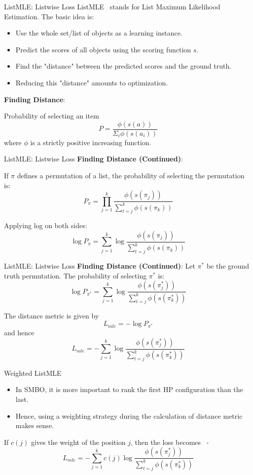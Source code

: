 \documentclass{beamer}
\begin{document}
\begin{frame}[t]{ListMLE: Listwise Loss}
ListMLE~\cite{listmlepaper} stands for List Maximum Likelihood Estimation.
The basic idea is:
\begin{itemize}
\item Use the whole set/list of objects as a learning instance.
\item Predict the scores of all objects using the scoring function $s$.
\item Find the "distance" between the predicted scores and the ground truth.
\item Reducing this "distance" amounts to optimization.
\end{itemize}

\textbf{Finding Distance}:

Probability of selecting an item
$$
P = \frac{\phi(s(a))}{\Sigma_i \phi(s(a_i))} 
$$
where $\phi$ is a strictly positive increasing function.
\end{frame}

\begin{frame}[t]{ListMLE: Listwise Loss}
\textbf{Finding Distance (Continued)}:

If $\pi$ defines a permutation of a list,  the probability of selecting the permutation is:
$$
P_{\pi} = \prod\limits_{j=1}^{k} \frac{\phi(s(\pi_j))}{ \sum\limits_{t=j}^k \phi(s(\pi_k))}
$$

Applying log on both sides:
$$
\log P_{\pi} = \sum\limits_{j=1}^{k} \log \frac{\phi(s(\pi_j))}{ \sum\limits_{t=j}^k \phi(s(\pi_k))}
$$

\end{frame}


\begin{frame}[t]{ListMLE: Listwise Loss}
\textbf{Finding Distance (Continued)}:
Let $\pi^*$ be the ground truth permutation. The probability of selecting $\pi^*$ is:
$$
\log P_{\pi^*} = \sum\limits_{j=1}^{k} \log \frac{\phi(s(\pi^*_j))}{ \sum\limits_{t=j}^k \phi(s(\pi^*_k))}
$$

The distance metric is given by
$$
L_{mle} = - \log P_{\pi^*}
$$
and hence
$$
L_{mle} = -  \sum\limits_{j=1}^{k} \log \frac{\phi(s(\pi^*_j))}{ \sum\limits_{t=j}^k \phi(s(\pi^*_k))}
$$

\end{frame}

\begin{frame}[t]{Weighted ListMLE}
\begin{itemize}
\item In SMBO,  it is more important to rank the first HP configuration than the last.
\item Hence,  using a weighting strategy during the calculation of distance metric makes sense.
\end{itemize}

If $c(j)$ gives the weight of the position $j$, then the loss becomes~\cite{TRLWO} -
$$
L_{mle} = -  \sum\limits_{j=1}^{k} c(j) \log \frac{\phi(s(\pi^*_j))}{ \sum\limits_{t=j}^k \phi(s(\pi^*_k))}
$$

\end{frame}
\end{document}
